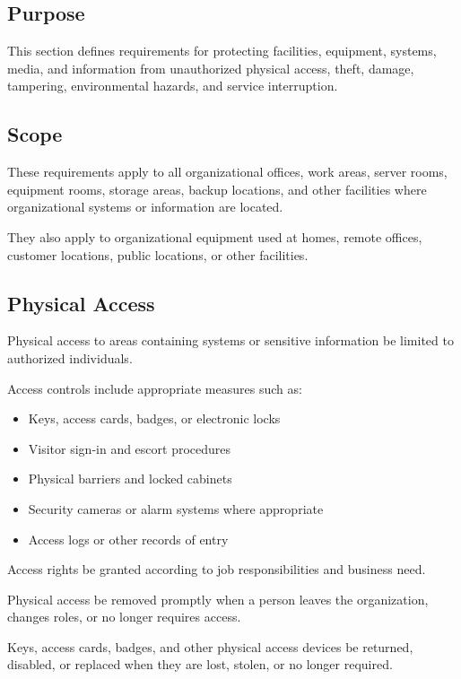 \subsection{Purpose}

This section defines requirements for protecting facilities, equipment, systems, media, and information from unauthorized physical access, theft, damage, tampering, environmental hazards, and service interruption.

\subsection{Scope}

These requirements apply to all organizational offices, work areas, server rooms, equipment rooms, storage areas, backup locations, and other facilities where organizational systems or information are located.

They also apply to organizational equipment used at homes, remote offices, customer locations, public locations, or other facilities.

\subsection{Physical Access}

Physical access to areas containing systems or sensitive information \must{} be limited to authorized individuals.

Access controls \should{} include appropriate measures such as:
\begin{itemize}
    \item Keys, access cards, badges, or electronic locks
    \item Visitor sign-in and escort procedures
    \item Physical barriers and locked cabinets
    \item Security cameras or alarm systems where appropriate
    \item Access logs or other records of entry
\end{itemize}

Access rights \must{} be granted according to job responsibilities and business need.

Physical access \must{} be removed promptly when a person leaves the organization, changes roles, or no longer requires access.

Keys, access cards, badges, and other physical access devices \must{} be returned, disabled, or replaced when they are lost, stolen, or no longer required.

